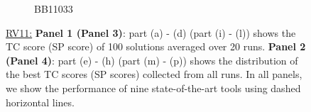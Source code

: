 \begin{figure}[!htbp]
\begin{adjustwidth}{-1cm}{-1cm}
\begin{subfigure}{0.26\textwidth}
			\caption{BB11033}
		\end{subfigure}
	\end{adjustwidth}
	\caption{\underline{RV11:} \textbf{Panel 1 (Panel 3)}: part (a) - (d) (part (i) - (l)) shows the TC score (SP score) of 100 solutions averaged over 20 runs. 
	\textbf{Panel 2 (Panel 4)}: part (e) - (h) (part (m) - (p)) shows the distribution of the best TC scores (SP scores) collected from all runs. In all panels, we show the performance of nine state-of-the-art tools using dashed horizontal lines.}
	\label{fig:rv11_tc_sp}
	
\end{figure}


